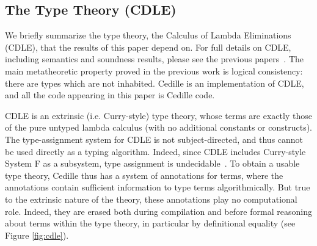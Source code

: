 \documentclass[acmsmall,screen]{acmart}
\newcommand{\labsec}[1]{\label{sec:#1}}
\newcommand{\reffig}[1]{Figure \ref{fig:#1}}
\begin{document}
\subsection{The Type Theory (CDLE)}
\labsec{back:cdle}

We briefly summarize the type theory, the Calculus of Lambda
Eliminations (CDLE), that the results of this paper depend on.  For
full details on CDLE, including semantics and soundness results,
please see the previous papers~\cite{stump17a,stump18,lang:cedille}.  The main
metatheoretic property proved in the previous work is logical
consistency: there are types which are not inhabited.  Cedille is an
implementation of CDLE, and all the code appearing in this paper is
Cedille code.

CDLE is an extrinsic (i.e. Curry-style)
type theory, whose terms are exactly those of the pure untyped lambda
calculus (with no additional constants or constructs).  The
type-assignment system for CDLE is not subject-directed, and thus
cannot be used directly as a typing algorithm.  Indeed, since CDLE
includes Curry-style System F as a subsystem, type assignment is
undecidable~\cite{Wells99}.  To obtain a usable type theory, Cedille
thus has a system of annotations for terms, where the annotations
contain sufficient information to type terms algorithmically.  But
true to the extrinsic nature of the theory, these annotations play no
computational role.  Indeed, they are erased both during compilation
and before formal reasoning about terms within the type theory, in
particular by definitional equality (see \reffig{cdle}).
\end{document}
